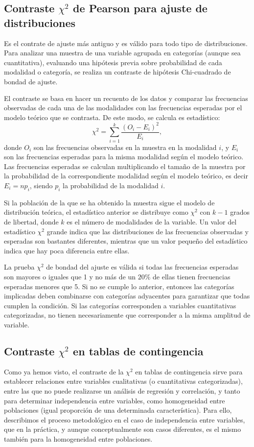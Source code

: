 \subsection{Contraste $\chi^{2}$ de Pearson para ajuste de distribuciones}
Es el contrate de ajuste más antiguo y es válido para todo tipo de distribuciones. Para analizar una muestra de una variable agrupada en
categorías (aunque sea cuantitativa), evaluando una hipótesis previa sobre probabilidad de cada modalidad o categoría, se realiza un
contraste de hipótesis Chi-cuadrado de bondad de ajuste.

El contraste se basa en hacer un recuento de los datos y comparar las frecuencias observadas de cada una de las modalidades con las
frecuencias esperadas por el modelo teórico que se contrasta. De este modo, se calcula es estadístico:
\[
\chi ^2  = \sum_{i = 1}^k \frac{(O_i  - E_i )^2} {E_i},
\]
donde $O_i$ son las frecuencias observadas en la muestra en la modalidad $i$, y  $E_i$ son las frecuencias esperadas para la misma modalidad
según el modelo teórico. Las frecuencias esperadas se calculan multiplicando el tamaño de la muestra por la probabilidad de la
correspondiente modalidad según el modelo teórico, es decir $E_i=np_i$, siendo $p_i$ la probabilidad de la modalidad $i$.

Si la población de la que se ha obtenido la muestra sigue el modelo de distribución teórica, el estadístico anterior se distribuye como
$\chi^{2}$ con $k-1$ grados de libertad, donde $k$ es el número de modalidades de la variable. Un valor del estadístico $\chi^{2}$ grande
indica que las distribuciones de las frecuencias observadas y esperadas son bastantes diferentes, mientras que un valor pequeño del
estadístico indica que hay poca diferencia entre ellas.

La prueba $\chi^2$ de bondad del ajuste es válida si todas las frecuencias esperadas son mayores o iguales que 1 y no más de un $20\%$ de
ellas tienen frecuencias esperadas menores que 5. Si no se cumple lo anterior, entonces las categorías implicadas deben combinarse con
categorías adyacentes para garantizar que todas cumplen la condición. Si las categorías corresponden a variables cuantitativas
categorizadas, no tienen necesariamente que corresponder a la misma amplitud de variable.


\subsection{Contraste $\chi^{2}$ en tablas de contingencia}
Como ya hemos visto, el contraste de la $\chi^2$ en tablas de contingencia sirve para establecer relaciones entre variables cualitativas (o
cuantitativas categorizadas), entre las que no puede realizarse un análisis de regresión y correlación, y tanto para determinar
independencia entre variables, como homogeneidad entre poblaciones (igual proporción de una determinada característica). Para ello,
describimos el proceso metodológico en el caso de independencia entre variables, que en la práctica, y aunque conceptualmente son casos
diferentes, es el mismo también para la homogeneidad entre poblaciones.

